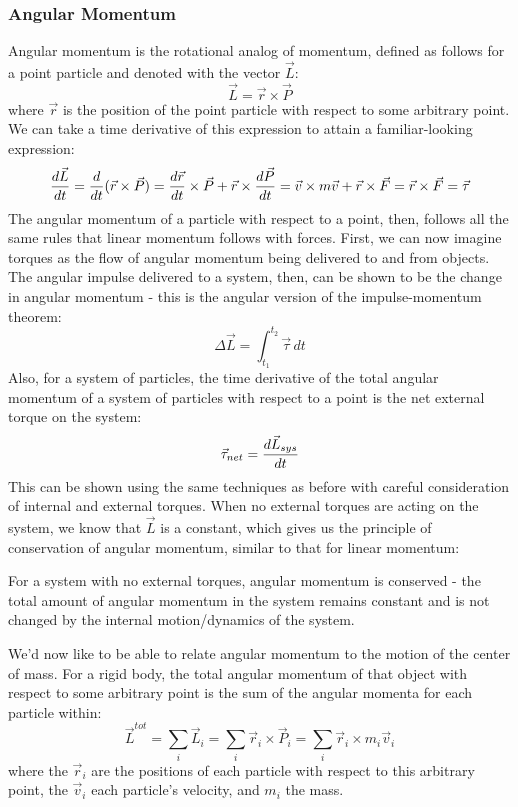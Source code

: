 \subsubsection{Angular Momentum}
Angular momentum is the rotational analog of momentum, defined as follows for a point particle and denoted with the vector $\vec L$:
\[
	\vec L = \vec r \times \vec P
\]
where $\vec r$ is the position of the point particle with respect to some arbitrary point. 
We can take a time derivative of this expression to attain a familiar-looking expression:
\[
	\frac{d \vec L}{d t} = \frac{d }{d t}(\vec r \times \vec P) = \frac{d \vec r}{d t} \times \vec P + \vec r \times \frac{d \vec P}{d t} = \vec v \times m\vec v + \vec r \times \vec F = \vec r \times \vec F = \vec \tau
\]
The angular momentum of a particle with respect to a point, then, follows all the same rules that linear momentum follows with forces. First, we can now imagine torques as the flow of angular momentum being delivered to and from objects. The angular impulse delivered to a system, then, can be shown to be the change in angular momentum - this is the angular version of the impulse-momentum theorem: 
\[
	\Delta \vec L = \int_{t_1}^{t_2} \vec \tau \, dt
\]
Also, for a system of particles, the time derivative of the total angular momentum of a system of particles with respect to a point is the net external torque on the system:
\[
	\vec \tau_{net} = \frac{d \vec L_{sys}}{d t}
\]
This can be shown using the same techniques as before with careful consideration of internal and external torques. When no external torques are acting on the system, we know that $\vec L$ is a constant, which gives us the principle of conservation of angular momentum, similar to that for linear momentum: 
\begin{mdframed}[frametitle=Conservation of Angular Momentum]
For a system with no external torques, angular momentum is conserved - the total amount of angular momentum in the system remains constant and is not changed by the internal motion/dynamics of the system.
\end{mdframed}
We'd now like to be able to relate angular momentum to the motion of the center of mass. For a rigid body, the total angular momentum of that object with respect to some arbitrary point is the sum of the angular momenta for each particle within:
\[
	\vec L^{tot} = \sum_i \vec L_i = \sum_i \vec r_i \times \vec P_i = \sum_i \vec r_i \times m_i \vec v_i
\]
where the $\vec r_i$ are the positions of each particle with respect to this arbitrary point, the $\vec v_i$ each particle's velocity, and $m_i$ the mass. \\
